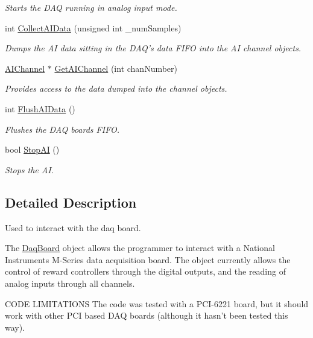\begin{DoxyCompactItemize}
\begin{DoxyCompactList}\small\item\em Starts the D\-A\-Q running in analog input mode. \end{DoxyCompactList}\item 
int \hyperlink{class_daq_board_acd72291e1f936f452c543c8171292314}{Collect\-A\-I\-Data} (unsigned int \-\_\-num\-Samples)
\begin{DoxyCompactList}\small\item\em Dumps the A\-I data sitting in the D\-A\-Q's data F\-I\-F\-O into the A\-I channel objects. \end{DoxyCompactList}\item 
\hyperlink{class_daq_board_a71c2d161d06f7c013aa1baa14c05a465}{A\-I\-Channel} $\ast$ \hyperlink{class_daq_board_a7ea5b8dc89ba6e904d85cb6e4ffffdb6}{Get\-A\-I\-Channel} (int chan\-Number)
\begin{DoxyCompactList}\small\item\em Provides access to the data dumped into the channel objects. \end{DoxyCompactList}\item 
int \hyperlink{class_daq_board_af9bb2d698a93184849119720ffcdc676}{Flush\-A\-I\-Data} ()
\begin{DoxyCompactList}\small\item\em Flushes the D\-A\-Q boards F\-I\-F\-O. \end{DoxyCompactList}\item 
bool \hyperlink{class_daq_board_af4505522da49d132d3170493582c0890}{Stop\-A\-I} ()
\begin{DoxyCompactList}\small\item\em Stops the A\-I. \end{DoxyCompactList}\end{DoxyCompactItemize}


\subsection{Detailed Description}
Used to interact with the daq board. 

The \hyperlink{class_daq_board}{Daq\-Board} object allows the programmer to interact with a National Instruments M-\/\-Series data acquisition board. The object currently allows the control of reward controllers through the digital outputs, and the reading of analog inputs through all channels.

C\-O\-D\-E L\-I\-M\-I\-T\-A\-T\-I\-O\-N\-S The code was tested with a P\-C\-I-\/6221 board, but it should work with other P\-C\-I based D\-A\-Q boards (although it hasn't been tested this way).

